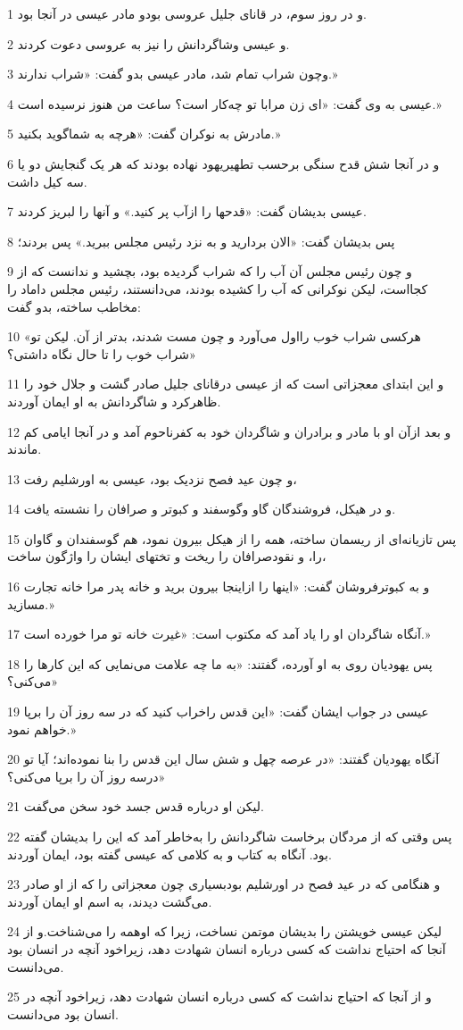\par 1 و در روز سوم، در قانای جلیل عروسی بودو مادر عیسی در آنجا بود.
\par 2 و عیسی وشاگردانش را نیز به عروسی دعوت کردند.
\par 3 وچون شراب تمام شد، مادر عیسی بدو گفت: «شراب ندارند.»
\par 4 عیسی به وی گفت: «ای زن مرابا تو چه‌کار است؟ ساعت من هنوز نرسیده است.»
\par 5 مادرش به نوکران گفت: «هر‌چه به شماگوید بکنید.»
\par 6 و در آنجا شش قدح سنگی برحسب تطهیریهود نهاده بودند که هر یک گنجایش دو یا سه کیل داشت.
\par 7 عیسی بدیشان گفت: «قدحها را ازآب پر کنید.» و آنها را لبریز کردند.
\par 8 پس بدیشان گفت: «الان بردارید و به نزد رئیس مجلس ببرید.» پس بردند؛
\par 9 و چون رئیس مجلس آن آب را که شراب گردیده بود، بچشید و ندانست که از کجااست، لیکن نوکرانی که آب را کشیده بودند، می‌دانستند، رئیس مجلس داماد را مخاطب ساخته، بدو گفت:
\par 10 «هرکسی شراب خوب رااول می‌آورد و چون مست شدند، بدتر از آن. لیکن تو شراب خوب را تا حال نگاه داشتی؟»
\par 11 و این ابتدای معجزاتی است که از عیسی درقانای جلیل صادر گشت و جلال خود را ظاهرکرد و شاگردانش به او ایمان آوردند.
\par 12 و بعد ازآن او با مادر و برادران و شاگردان خود به کفرناحوم آمد و در آنجا ایامی کم ماندند.
\par 13 و چون عید فصح نزدیک بود، عیسی به اورشلیم رفت،
\par 14 و در هیکل، فروشندگان گاو وگوسفند و کبوتر و صرافان را نشسته یافت.
\par 15 پس تازیانه‌ای از ریسمان ساخته، همه را از هیکل بیرون نمود، هم گوسفندان و گاوان را، و نقودصرافان را ریخت و تختهای ایشان را واژگون ساخت،
\par 16 و به کبوترفروشان گفت: «اینها را ازاینجا بیرون برید و خانه پدر مرا خانه تجارت مسازید.»
\par 17 آنگاه شاگردان او را یاد آمد که مکتوب است: «غیرت خانه تو مرا خورده است.»
\par 18 پس یهودیان روی به او آورده، گفتند: «به ما چه علامت می‌نمایی که این کارها را می‌کنی؟»
\par 19 عیسی در جواب ایشان گفت: «این قدس راخراب کنید که در سه روز آن را برپا خواهم نمود.»
\par 20 آنگاه یهودیان گفتند: «در عرصه چهل و شش سال این قدس را بنا نموده‌اند؛ آیا تو درسه روز آن را برپا می‌کنی؟»
\par 21 لیکن او درباره قدس جسد خود سخن می‌گفت.
\par 22 پس وقتی که از مردگان برخاست شاگردانش را به‌خاطر آمد که این را بدیشان گفته بود. آنگاه به کتاب و به کلامی که عیسی گفته بود، ایمان آوردند.
\par 23 و هنگامی که در عید فصح در اورشلیم بودبسیاری چون معجزاتی را که از او صادر می‌گشت دیدند، به اسم او ایمان آوردند.
\par 24 لیکن عیسی خویشتن را بدیشان موتمن نساخت، زیرا که اوهمه را می‌شناخت.و از آنجا که احتیاج نداشت که کسی درباره انسان شهادت دهد، زیراخود آنچه در انسان بود می‌دانست.
\par 25 و از آنجا که احتیاج نداشت که کسی درباره انسان شهادت دهد، زیراخود آنچه در انسان بود می‌دانست.

